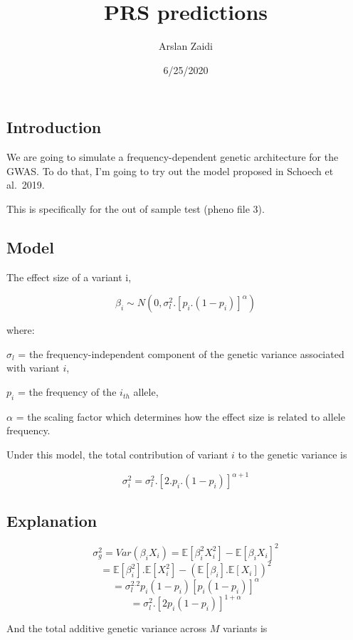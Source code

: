 \documentclass[]{article}
\title{PRS predictions}
\author{Arslan Zaidi}
\date{6/25/2020}
\begin{document}
\maketitle

{
\setcounter{tocdepth}{2}
\tableofcontents
}
\hypertarget{introduction}{%
\subsection{Introduction}\label{introduction}}

We are going to simulate a frequency-dependent genetic architecture for
the GWAS. To do that, I'm going to try out the model proposed in Schoech
et al.~2019.

This is specifically for the out of sample test (pheno file 3).

\hypertarget{model}{%
\subsection{Model}\label{model}}

The effect size of a variant i,

\[\beta_i \sim N( 0, \sigma_{l}^2 . [p_i.(1-p_i)]^\alpha )\]

where:

\(\sigma_l\) = the frequency-independent component of the genetic
variance associated with variant \(i\),

\(p_i\) = the frequency of the \(i_{th}\) allele,

\(\alpha\) = the scaling factor which determines how the effect size is
related to allele frequency.

Under this model, the total contribution of variant \(i\) to the genetic
variance is

\[\sigma_{i}^2 = \sigma_l^2.[2.p_i.(1-p_i)]^{\alpha+1}\]

\hypertarget{explanation}{%
\subsection{Explanation}\label{explanation}}

\[\sigma_{g}^2 = Var(\beta_iX_i) = \mathbb{E}[\beta_i^2X_i^2] - \mathbb{E}[\beta_iX_i]^2\]
\[ = \mathbb{E}[\beta_i^2].\mathbb{E}[X_i^2] - (\mathbb{E}[\beta_i].\mathbb{E}[X_i])^2\]
\[ = \sigma_l^2.2p_i(1-p_i)[p_i(1-p_i)]^\alpha\]
\[ = \sigma_l^2.[2p_i(1-p_i)]^{1+\alpha}\]

And the total additive genetic variance across \(M\) variants is
\end{document}
